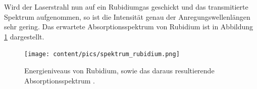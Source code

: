Wird der Laserstrahl nun auf ein Rubidiumgas geschickt und das transmitierte Spektrum aufgenommen, so ist die Intensität genau der Anregungswellenlängen sehr gering. Das erwartete 
Absorptionsspektrum von Rubidium ist in Abbildung \ref{fig:spektrum_rubidium} dargestellt.

\begin{figure}
    \centering
    \texttt{[image: content/pics/spektrum\_rubidium.png]}
    \caption{Energieniveaus von Rubidium, sowie das daraus resultierende Absorptionsspektrum \cite{diode_laser_spectroscopy}.}
    \label{fig:spektrum_rubidium}
\end{figure}
